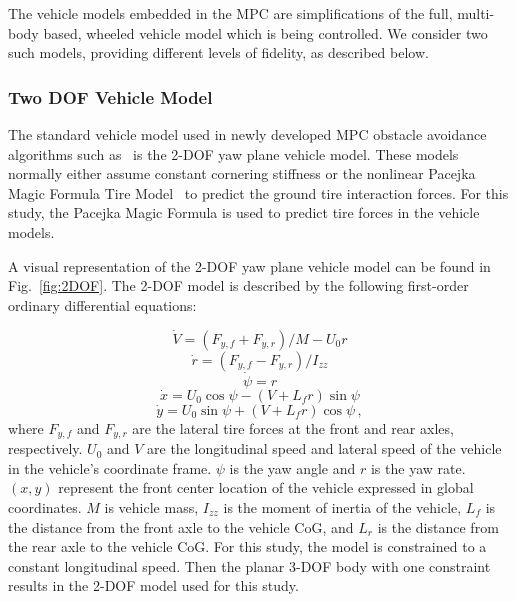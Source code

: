 \documentclass[12pt,twocolumn]{article}
\newcommand{\CHRONO}{{\sffamily{{Chrono}}}}
\begin{document}
The vehicle models embedded in the MPC are simplifications of the full, multi-body based, {\CHRONO} wheeled vehicle model which is being controlled.  We consider two such models, providing different levels of fidelity, as described below.


\subsubsection{Two DOF Vehicle Model}\label{sss:2DOFModel}
The standard vehicle model used in newly developed MPC obstacle avoidance algorithms such as~\cite{ModelFidelity2016} is the 2-DOF yaw plane vehicle model. These models normally either assume constant cornering stiffness or the nonlinear Pacejka Magic Formula Tire Model~\cite{Pacejka1997} to predict the ground tire interaction forces. For this study, the Pacejka Magic Formula is used to predict tire forces in the vehicle models.   

A visual representation of the 2-DOF yaw plane vehicle model can be found in Fig.~\ref{fig:2DOF}. The 2-DOF model is described by the following first-order ordinary differential equations:

\begin{equation}\label{e:2DOF_Vdot}
\dot{V} = \left(F_{y,f} + F_{y,r}\right)/{M - U_0r} 
\end{equation}
\begin{equation}\label{e:2DOF_rdot}
\dot{r} = \left(F_{y,f} - F_{y,r}\right)/I_{zz}
\end{equation}
\begin{equation}\label{e:2DOF_psidot}
\dot{\psi} = r 
\end{equation}
\begin{equation}\label{e:2DOF_xdot}
\dot{x} = U_0\cos{\psi}-\left(V+L_fr\right)\sin{\psi}
\end{equation}
\begin{equation}\label{e:2DOF_ydot}
\dot{y} = U_0\sin{\psi}+\left(V+L_fr\right)\cos{\psi} \,,
\end{equation}
%
where $F_{y,f}$ and $F_{y,r}$ are the lateral tire forces at the front and rear axles, respectively. $U_0$ and $V$ are the longitudinal speed and lateral speed of the vehicle in the vehicle’s coordinate frame. $\psi$ is the yaw angle and $r$ is the yaw rate. $\left(x,y\right)$ represent the front center location of the vehicle expressed in global coordinates. $M$ is vehicle mass, $I_{zz}$ is the moment of inertia of the vehicle, $L_f$ is the distance from the front axle to the vehicle CoG, and $L_r$ is the distance from the rear axle to the vehicle CoG. For this study, the model is constrained to a constant longitudinal speed. Then the planar 3-DOF body with one constraint results in the 2-DOF model used for this study.
\end{document}
